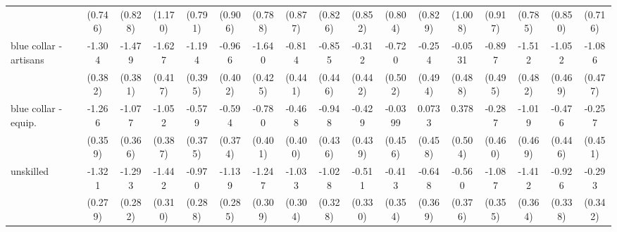 {\begin{tabular}{l*{16}{c}}
                    &     (0.746)         &     (0.828)         &     (1.170)         &     (0.791)         &     (0.906)         &     (0.788)         &     (0.877)         &     (0.826)         &     (0.852)         &     (0.804)         &     (0.829)         &     (1.008)         &     (0.917)         &     (0.785)         &     (0.850)         &     (0.716)         \\
[1em]
blue collar - artisans&      -1.304\sym{***}&      -1.479\sym{***}&      -1.627\sym{***}&      -1.194\sym{**} &      -0.966\sym{*}  &      -1.640\sym{***}&      -0.814         &      -0.855         &      -0.312         &      -0.720         &      -0.254         &     -0.0531         &      -0.897         &      -1.512\sym{**} &      -1.052\sym{*}  &      -1.086\sym{*}  \\
                    &     (0.382)         &     (0.381)         &     (0.417)         &     (0.395)         &     (0.402)         &     (0.425)         &     (0.441)         &     (0.446)         &     (0.442)         &     (0.502)         &     (0.494)         &     (0.488)         &     (0.495)         &     (0.482)         &     (0.469)         &     (0.477)         \\
[1em]
blue collar - equip.&      -1.266\sym{***}&      -1.077\sym{**} &      -1.052\sym{**} &      -0.579         &      -0.594         &      -0.780         &      -0.468         &      -0.948\sym{*}  &      -0.429         &     -0.0399         &      0.0733         &       0.378         &      -0.287         &      -1.019\sym{*}  &      -0.476         &      -0.257         \\
                    &     (0.359)         &     (0.366)         &     (0.387)         &     (0.375)         &     (0.374)         &     (0.401)         &     (0.400)         &     (0.436)         &     (0.439)         &     (0.456)         &     (0.458)         &     (0.504)         &     (0.460)         &     (0.469)         &     (0.446)         &     (0.451)         \\
[1em]
unskilled           &      -1.321\sym{***}&      -1.293\sym{***}&      -1.442\sym{***}&      -0.970\sym{***}&      -1.139\sym{***}&      -1.247\sym{***}&      -1.033\sym{***}&      -1.028\sym{**} &      -0.511         &      -0.413         &      -0.648         &      -0.560         &      -1.087\sym{**} &      -1.412\sym{***}&      -0.926\sym{**} &      -0.293         \\
                    &     (0.279)         &     (0.282)         &     (0.310)         &     (0.288)         &     (0.285)         &     (0.309)         &     (0.304)         &     (0.328)         &     (0.330)         &     (0.354)         &     (0.369)         &     (0.376)         &     (0.355)         &     (0.364)         &     (0.338)         &     (0.342)         \\

\end{tabular}}
